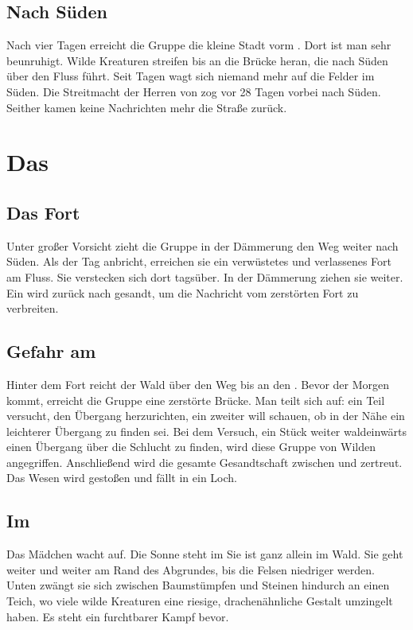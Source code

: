 \begin{huge}
\section{Nach Süden}
Nach vier Tagen erreicht die Gruppe die kleine Stadt \Planis vorm \Grunarm. Dort ist man sehr beunruhigt. Wilde Kreaturen streifen bis an die Brücke heran, die nach Süden über den Fluss \Grunarm führt. Seit Tagen wagt sich niemand mehr auf die Felder im Süden. Die Streitmacht der Herren von \Rhingell zog vor 28 Tagen vorbei nach Süden. Seither kamen keine Nachrichten mehr die Straße zurück.
 
\chapter{Das \Grunland}
\section{Das Fort}
Unter großer Vorsicht zieht die Gruppe in der Dämmerung den Weg weiter nach Süden. Als der Tag anbricht, erreichen sie ein verwüstetes und verlassenes Fort am Fluss. Sie verstecken sich dort tagsüber. In der Dämmerung ziehen sie weiter. Ein \Schattenjager wird zurück nach \Planis gesandt, um die Nachricht vom zerstörten Fort zu verbreiten.

\section{Gefahr am \Dreifluss}
Hinter dem Fort reicht der Wald über den Weg bis an den \Dreifluss. Bevor der Morgen kommt, erreicht die Gruppe eine zerstörte Brücke. Man teilt sich auf: ein Teil versucht, den Übergang herzurichten, ein zweiter will schauen, ob in der Nähe ein leichterer Übergang zu finden sei. Bei dem Versuch, ein Stück weiter waldeinwärts einen Übergang über die Schlucht zu finden, wird diese Gruppe von Wilden angegriffen. Anschließend wird die gesamte Gesandtschaft zwischen \Dreifluss und \Riesenwald zertreut. Das Wesen wird gestoßen und fällt in ein Loch.

\section{Im \Riesenwald}
Das Mädchen wacht auf. Die Sonne steht im Sie ist ganz allein im Wald. Sie geht weiter und weiter am Rand des Abgrundes, bis die Felsen niedriger werden. Unten zwängt sie sich zwischen Baumstümpfen und Steinen hindurch an einen Teich, wo viele wilde Kreaturen eine riesige, drachenähnliche Gestalt umzingelt haben. Es steht ein furchtbarer Kampf bevor.


\end{huge}
